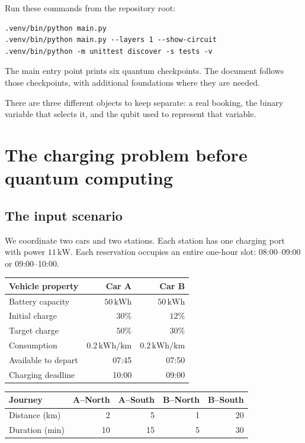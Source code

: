 Run these commands from the repository root:
\begin{lstlisting}
.venv/bin/python main.py
.venv/bin/python main.py --layers 1 --show-circuit
.venv/bin/python -m unittest discover -s tests -v
\end{lstlisting}
The main entry point prints six quantum checkpoints. The document follows those
checkpoints, with additional foundations where they are needed.

\begin{keyidea}
There are three different objects to keep separate: a real booking, the binary
variable that selects it, and the qubit used to represent that variable.
\end{keyidea}

\section{The charging problem before quantum computing}\label{sec:physical}
\subsection{The input scenario}
We coordinate two cars and two stations. Each station has one charging port
with power $11\,\mathrm{kW}$. Each reservation occupies an entire one-hour slot:
08:00--09:00 or 09:00--10:00.

\begin{center}
\begin{tabular}{lrr}
\toprule
Vehicle property & Car A & Car B\\
\midrule
Battery capacity & $50\,\mathrm{kWh}$ & $50\,\mathrm{kWh}$\\
Initial charge & $30\%$ & $12\%$\\
Target charge & $50\%$ & $30\%$\\
Consumption & $0.2\,\mathrm{kWh/km}$ & $0.2\,\mathrm{kWh/km}$\\
Available to depart & 07:45 & 07:50\\
Charging deadline & 10:00 & 09:00\\
\bottomrule
\end{tabular}
\end{center}

\begin{center}
\begin{tabular}{lrrrr}
\toprule
Journey & A--North & A--South & B--North & B--South\\
\midrule
Distance (km) & 2 & 5 & 1 & 20\\
Duration (min) & 10 & 15 & 5 & 30\\
\bottomrule
\end{tabular}
\end{center}

